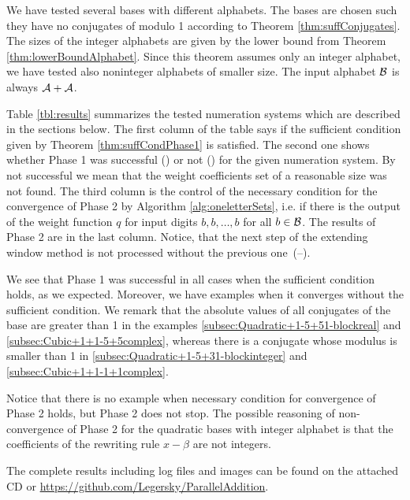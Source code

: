 We have tested several bases with different alphabets. The bases are chosen such they have no conjugates of modulo 1 according to Theorem \ref{thm:suffConjugates}. The sizes of the integer alphabets are given by the lower bound from Theorem \ref{thm:lowerBoundAlphabet}. Since this theorem assumes only an integer alphabet, we have tested also noninteger alphabets of smaller size. The input alphabet $\mathcal{B}$ is always $\mathcal{A}+ \mathcal{A}$.  

 Table \ref{tbl:results} summarizes the tested numeration systems which are described in the sections below. The first column of the table says if the sufficient condition given by Theorem \ref{thm:suffCondPhase1} is satisfied. The second one shows whether Phase 1 was successful (\checkmark) or not (\xmark) for the given numeration system. By not successful we mean that the weight coefficients set of a reasonable size was not found. The third column is the control of the necessary condition for the convergence of Phase 2 by Algorithm \ref{alg:oneletterSets}, i.e. if there is the output of the weight function $q$ for input digits $b,b,\dots,b$ for all $b\in\mathcal{B}$. The results of Phase 2 are in the last column. Notice, that the next step of the extending window method is not processed without the previous one~(--).

We see that Phase 1 was successful in all cases when the sufficient condition holds, as we expected. Moreover, we have examples when it converges without the sufficient condition. We remark that the absolute values of all conjugates of the base are greater than 1 in the examples \ref{subsec:Quadratic+1-5+51-blockreal} and \ref{subsec:Cubic+1+1-5+5complex}, whereas there is a conjugate whose modulus is smaller than 1 in \ref{subsec:Quadratic+1-5+31-blockinteger} and \ref{subsec:Cubic+1+1-1+1complex}.

Notice that there is no example when necessary condition for convergence of Phase 2 holds, but Phase 2 does not stop. The possible reasoning of non-convergence of Phase 2 for the quadratic bases with integer alphabet is that the coefficients of the rewriting rule $x-\beta$ are not integers.  

The complete results including log files and images can be found on the attached CD  or \url{https://github.com/Legersky/ParallelAddition}.

